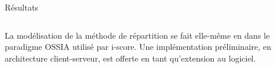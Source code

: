 \begin{columns}[t]
\begin{column}{\onecolwid}
          \begin{block}{Résultats}
          	\begin{columns}[t]
          		\begin{column}{\onecolwid}\justify
          			La modélisation de la méthode de répartition se fait elle-même en dans le paradigme OSSIA utilisé par i-score.
          			Une implémentation préliminaire, en architecture client-serveur, est offerte en tant qu'extension au logiciel.
          		\end{column}
          	\end{columns}        
            \end{block}
        \end{column}         
   \begin{column}{\sepwid}\end{column}		
\end{columns}

